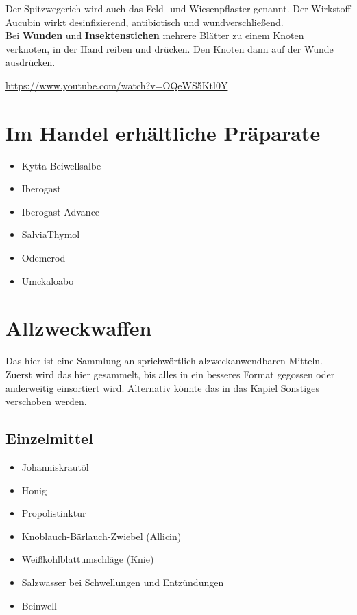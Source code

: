 
Der Spitzwegerich wird auch das Feld- und Wiesenpflaster genannt. Der Wirkstoff Aucubin wirkt desinfizierend, antibiotisch und wundverschließend.\\
Bei \textbf{Wunden} und \textbf{Insektenstichen} mehrere Blätter zu einem Knoten verknoten, in der Hand reiben und drücken. Den Knoten dann auf der Wunde ausdrücken. 

 

\cite{swrhandwerkskunst}  

\url{https://www.youtube.com/watch?v=OQeWS5Ktl0Y}




\newpage





\section{Im Handel erhältliche Präparate}


\begin{itemize}
	\item Kytta Beiwellsalbe
	\item Iberogast
	\item Iberogast Advance
	\item SalviaThymol
	\item Odemerod
	\item Umckaloabo
\end{itemize}


\newpage


\section{Allzweckwaffen}

Das hier ist eine Sammlung an sprichwörtlich alzweckanwendbaren Mitteln. Zuerst wird das hier gesammelt, bis alles in ein besseres Format gegossen oder anderweitig einsortiert wird. Alternativ könnte das in das Kapiel Sonstiges verschoben werden.

\subsection{Einzelmittel}
\begin{itemize}
	\item Johanniskrautöl
	\item Honig
	\item Propolistinktur
	\item Knoblauch-Bärlauch-Zwiebel (Allicin)
	\item Weißkohlblattumschläge (Knie)
	\item Salzwasser bei Schwellungen und Entzündungen
	\item Beinwell
\end{itemize}


